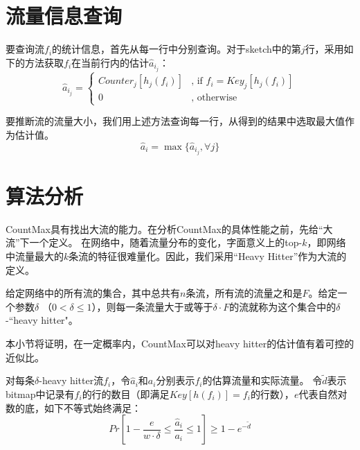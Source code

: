 \section{流量信息查询}
%
要查询流$f_i$的统计信息，首先从每一行中分别查询。对于sketch中的第$j$行，采用如下的方法获取$f_i$在当前行内的估计$\hat{a}_{i_{j}}$：
\begin{equation}
\hat{a}_{i_{j}}=\left\{
\begin{aligned}
Counter_{j}[h_j(f_i)]&\text{, if $f_i=Key_{j}[h_j(f_i)]$}\\
0&\text{, otherwise}
\end{aligned}
\right.
\end{equation}

要推断流的流量大小，我们用上述方法查询每一行，从得到的结果中选取最大值作为估计值。
\begin{equation}
\label{eq:query}
\hat{a}_{i}=\max{\{\hat{a}_{i_{j}} , \forall j\}}
\end{equation}

\section{算法分析}\label{sec:analysis}
\label{subsec:analysis}
%

CountMax具有找出大流的能力。在分析CountMax的具体性能之前，先给“大流”下一个定义。
在网络中，随着流量分布的变化，字面意义上的top-$k$，即网络中流量最大的$k$条流的特征很难量化。因此，我们采用“Heavy Hitter”作为大流的定义。


给定网络中的所有流的集合，其中总共有$n$条流，所有流的流量之和是$F$。给定一个参数$\delta$ （$0<\delta \le 1$），则每一条流量大于或等于$\delta\cdot F$的流就称为这个集合中的$\delta$-``heavy hitter"。


本小节将证明，在一定概率内，CountMax可以对heavy hitter的估计值有着可控的近似比。

\begin{theorem}
	\label{tm:query}
    对每条$\delta$-heavy hitter流$f_i$，令$\hat{a}_i$和$a_i$分别表示$f_i$的估算流量和实际流量。
    令$\tilde{d}$表示bitmap中记录有$f_i$的行的数目（即满足$Key[h(f_i)] = f_i$的行数），$e$代表自然对数的底，如下不等式始终满足：
	\begin{equation}
	\label{eq:hhacc}
	Pr[1-\frac{e}{w\cdot \delta}\le \frac{\hat{a}_i}{a_i} \le 1] \ge 1-e^{-\tilde{d}}
	\end{equation}
\end{theorem}

